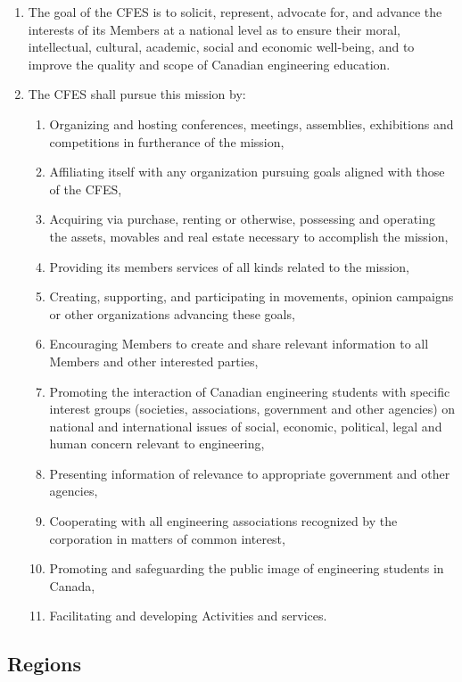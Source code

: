 \begin{enumerate}
 \item The goal of the CFES is to solicit, represent, advocate for, and advance the interests of its Members at a national level as to ensure their moral, intellectual, cultural, academic, social and economic well-being, and to improve the quality and scope of Canadian engineering education.
 \item The CFES shall pursue this mission by:
  \begin{enumerate}
   \item Organizing and hosting conferences, meetings, assemblies, exhibitions and competitions in furtherance of the mission,
   \item Affiliating itself with any organization pursuing goals aligned with those of the CFES,
   \item Acquiring via purchase, renting or otherwise, possessing and operating the assets, movables and real estate necessary to accomplish the mission,
   \item Providing its members services of all kinds related to the mission,
   \item Creating, supporting, and participating in movements, opinion campaigns or other organizations advancing these goals,
   \item Encouraging Members to create and share relevant information to all Members and other interested parties,
   \item Promoting the interaction of Canadian engineering students with specific interest groups (societies, associations, government and other agencies) on national and international issues of social, economic, political, legal and human concern relevant to engineering,
   \item Presenting information of relevance to appropriate government and other agencies,
   \item Cooperating with all engineering associations recognized by the corporation in matters of common interest,
   \item Promoting and safeguarding the public image of engineering students in Canada,
   \item Facilitating and developing Activities and services.
  \end{enumerate}
\end{enumerate}

\subsection{Regions}
\label{dispositions-regions}

